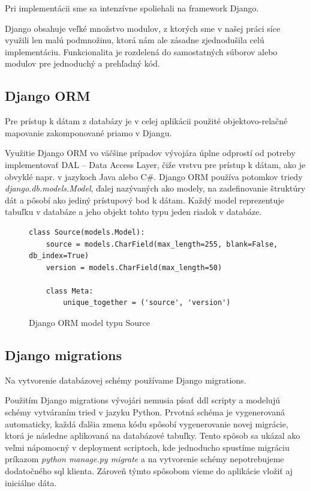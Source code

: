 Pri implementácii sme sa intenzívne spoliehali na framework Django.
\par Django obsahuje veľké množstvo modulov, z ktorých sme v našej práci síce využili len malú podmnožinu, ktorá nám ale zásadne zjednodušila celú implementáciu. Funkcionalita je rozdelená do samostatných súborov alebo modulov pre jednoduchý a prehľadný kód.

\subsection{Django ORM}
Pre prístup k dátam z databázy je v celej aplikácii použité objektovo-relačné mapovanie zakomponované priamo v Djangu.
\par Využitie Django ORM vo väčšine prípadov vývojára úplne odprostí od potreby implementovať DAL -- Data Access Layer, čiže vrstvu pre prístup k dátam, ako je obvyklé napr. v jazykoch Java alebo C\#. Django ORM používa potomkov triedy \emph{django.db.models.Model}, ďalej nazývaných ako modely, na zadefinovanie štruktúry dát a pôsobí ako jediný prístupový bod k dátam. Každý model reprezentuje tabuľku v databáze a jeho objekt tohto typu jeden riadok v databáze.

\begin{figure}[htbp]
\centering
\begin{minipage}{0.9\textwidth}
\lstset{tabsize=4,columns=flexible,breaklines=true,breakatwhitespace=true, showstringspaces=false}
\begin{lstlisting}
class Source(models.Model):
    source = models.CharField(max_length=255, blank=False, db_index=True)
    version = models.CharField(max_length=50)

    class Meta:
        unique_together = ('source', 'version')
\end{lstlisting} 		
\end{minipage} 
\caption{Django ORM model typu Source}
\label{fig:static-analysis}
\end{figure}

\subsection{Django migrations}
Na vytvorenie databázovej schémy používame Django migrations.
\par Použitím Django migrations vývojári nemusia písať ddl scripty a modelujú schémy vytváraním tried v jazyku Python. Prvotná schéma je vygenerovaná automaticky, každá ďalšia zmena kódu spôsobí vygenerovanie novej migrácie, ktorá je následne aplikovaná na databázové tabuľky. Tento spôsob sa ukázal ako veľmi nápomocný v deployment scriptoch, kde jednoducho spustíme migráciu príkazom \emph{python manage.py migrate} a na vytvorenie schémy nepotrebujeme dodatočného sql klienta. Zároveň týmto spôsobom vieme do aplikácie vložiť aj iniciálne dáta.

